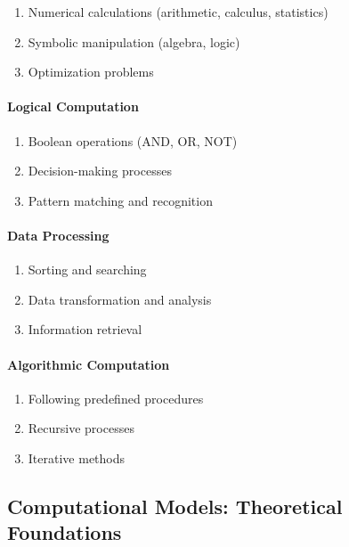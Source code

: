 \begin{enumerate}
\item Numerical calculations (arithmetic, calculus, statistics)
\item Symbolic manipulation (algebra, logic)
\item Optimization problems
\end{enumerate}

\paragraph{Logical Computation}
\label{para:logical-computation}

\begin{enumerate}
\item Boolean operations (AND, OR, NOT)
\item Decision-making processes
\item Pattern matching and recognition
\end{enumerate}

\paragraph{Data Processing}
\label{para:data-processing}

\begin{enumerate}
\item Sorting and searching
\item Data transformation and analysis
\item Information retrieval
\end{enumerate}

\paragraph{Algorithmic Computation}
\label{para:algorithmic-computation}

\begin{enumerate}
\item Following predefined procedures
\item Recursive processes
\item Iterative methods
\end{enumerate}

\subsection{Computational Models: Theoretical Foundations}
\label{subsec:computational-models}

